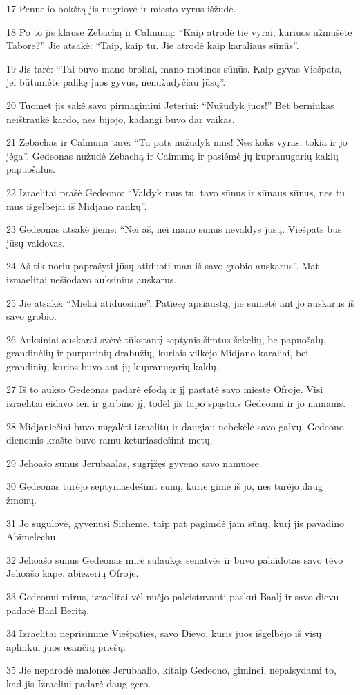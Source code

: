 \par 17 Penuelio bokštą jis nugriovė ir miesto vyrus išžudė. 
\par 18 Po to jis klausė Zebachą ir Calmuną: “Kaip atrodė tie vyrai, kuriuos užmušėte Tabore?” Jie atsakė: “Taip, kaip tu. Jie atrodė kaip karaliaus sūnūs”. 
\par 19 Jis tarė: “Tai buvo mano broliai, mano motinos sūnūs. Kaip gyvas Viešpats, jei būtumėte palikę juos gyvus, nenužudyčiau jūsų”. 
\par 20 Tuomet jis sakė savo pirmagimiui Jeteriui: “Nužudyk juos!” Bet berniukas neištraukė kardo, nes bijojo, kadangi buvo dar vaikas. 
\par 21 Zebachas ir Calmuna tarė: “Tu pats nužudyk mus! Nes koks vyras, tokia ir jo jėga”. Gedeonas nužudė Zebachą ir Calmuną ir pasiėmė jų kupranugarių kaklų papuošalus. 
\par 22 Izraelitai prašė Gedeono: “Valdyk mus tu, tavo sūnus ir sūnaus sūnus, nes tu mus išgelbėjai iš Midjano rankų”. 
\par 23 Gedeonas atsakė jiems: “Nei aš, nei mano sūnus nevaldys jūsų. Viešpats bus jūsų valdovas. 
\par 24 Aš tik noriu paprašyti jūsų atiduoti man iš savo grobio auskarus”. Mat izmaelitai nešiodavo auksinius auskarus. 
\par 25 Jie atsakė: “Mielai atiduosime”. Patiesę apsiaustą, jie sumetė ant jo auskarus iš savo grobio. 
\par 26 Auksiniai auskarai svėrė tūkstantį septynis šimtus šekelių, be papuošalų, grandinėlių ir purpurinių drabužių, kuriais vilkėjo Midjano karaliai, bei grandinių, kurios buvo ant jų kupranugarių kaklų. 
\par 27 Iš to aukso Gedeonas padarė efodą ir jį pastatė savo mieste Ofroje. Visi izraelitai eidavo ten ir garbino jį, todėl jis tapo spąstais Gedeonui ir jo namams. 
\par 28 Midjaniečiai buvo nugalėti izraelitų ir daugiau nebekėlė savo galvų. Gedeono dienomis krašte buvo ramu keturiasdešimt metų. 
\par 29 Jehoašo sūnus Jerubaalas, sugrįžęs gyveno savo namuose. 
\par 30 Gedeonas turėjo septyniasdešimt sūnų, kurie gimė iš jo, nes turėjo daug žmonų. 
\par 31 Jo sugulovė, gyvenusi Sicheme, taip pat pagimdė jam sūnų, kurį jis pavadino Abimelechu. 
\par 32 Jehoašo sūnus Gedeonas mirė sulaukęs senatvės ir buvo palaidotas savo tėvo Jehoašo kape, abiezerių Ofroje. 
\par 33 Gedeonui mirus, izraelitai vėl nuėjo paleistuvauti paskui Baalį ir savo dievu padarė Baal Beritą. 
\par 34 Izraelitai neprisiminė Viešpaties, savo Dievo, kuris juos išgelbėjo iš visų aplinkui juos esančių priešų. 
\par 35 Jie neparodė malonės Jerubaalio, kitaip Gedeono, giminei, nepaisydami to, kad jis Izraeliui padarė daug gero.



